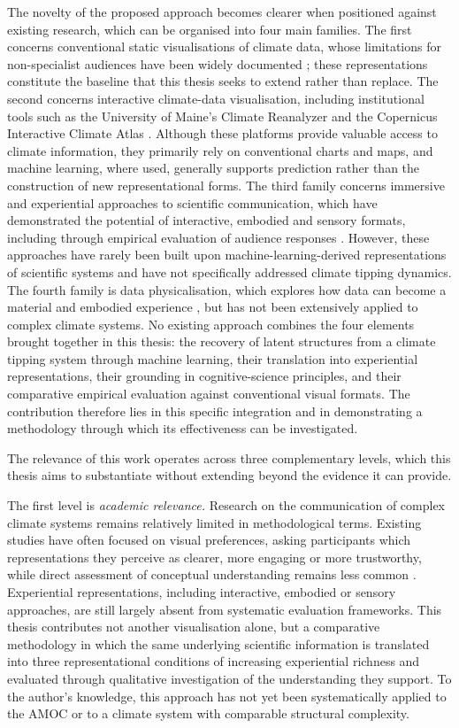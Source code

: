 The novelty of the proposed approach becomes clearer when positioned against existing research, which can be organised into four main families. The first concerns conventional static visualisations of climate data, whose limitations for non-specialist audiences have been widely documented \citep{harold2016, kause2020}; these representations constitute the baseline that this thesis seeks to extend rather than replace. The second concerns interactive climate-data visualisation, including institutional tools such as the University of Maine's Climate Reanalyzer \citep{climatereanalyzer} and the Copernicus Interactive Climate Atlas \citep{c3satlas}. Although these platforms provide valuable access to climate information, they primarily rely on conventional charts and maps, and machine learning, where used, generally supports prediction rather than the construction of new representational forms. The third family concerns immersive and experiential approaches to scientific communication, which have demonstrated the potential of interactive, embodied and sensory formats, including through empirical evaluation of audience responses \citep{zelada2024unnatural}. However, these approaches have rarely been built upon machine-learning-derived representations of scientific systems and have not specifically addressed climate tipping dynamics. The fourth family is data physicalisation, which explores how data can become a material and embodied experience \citep{lupi2016}, but has not been extensively applied to complex climate systems. No existing approach combines the four elements brought together in this thesis: the recovery of latent structures from a climate tipping system through machine learning, their translation into experiential representations, their grounding in cognitive-science principles, and their comparative empirical evaluation against conventional visual formats. The contribution therefore lies in this specific integration and in demonstrating a methodology through which its effectiveness can be investigated.

The relevance of this work operates across three complementary levels, which this thesis aims to substantiate without extending beyond the evidence it can provide. 

The first level is \emph{academic relevance.} Research on the communication of complex climate systems remains relatively limited in methodological terms. Existing studies have often focused on visual preferences, asking participants which representations they perceive as clearer, more engaging or more trustworthy, while direct assessment of conceptual understanding remains less common \citep{harold2016}. Experiential representations, including interactive, embodied or sensory approaches, are still largely absent from systematic evaluation frameworks. This thesis contributes not another visualisation alone, but a comparative methodology in which the same underlying scientific information is translated into three representational conditions of increasing experiential richness and evaluated through qualitative investigation of the understanding they support. To the author's knowledge, this approach has not yet been systematically applied to the AMOC or to a climate system with comparable structural complexity. 

